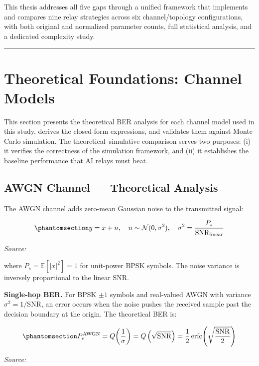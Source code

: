 This thesis addresses all five gaps through a unified framework that implements and compares nine relay strategies across six channel/topology configurations, with both original and normalized parameter counts, full statistical analysis, and a dedicated complexity study.

\begin{center}\rule{0.5\linewidth}{0.5pt}\end{center}

\section{Theoretical Foundations: Channel Models}\label{sec:theoretical-foundations-channel-models}

This section presents the theoretical BER analysis for each channel model used in this study, derives the closed-form expressions, and validates them against Monte Carlo simulation. The theoretical--simulative comparison serves two purposes: (i) it verifies the correctness of the simulation framework, and (ii) it establishes the baseline performance that AI relays must beat.

\subsection{AWGN Channel --- Theoretical Analysis}\label{sec:awgn-channel-theoretical-analysis}

The AWGN channel adds zero-mean Gaussian noise to the transmitted signal:

\begin{equation}\protect\phantomsection\label{eq:awgn-channel}{y = x + n, \quad n \sim \mathcal{N}(0, \sigma^2), \quad \sigma^2 = \frac{P_s}{\text{SNR}_{\text{linear}}}
}\end{equation} \par{\small\textit{Source: \cite{proakis2008digital}}}

where \(P_s = \mathbb{E}[|x|^2] = 1\) for unit-power BPSK symbols. The noise variance is inversely proportional to the linear SNR.

\textbf{Single-hop BER.} For BPSK \(\pm 1\) symbols and real-valued AWGN with variance \(\sigma^2 = 1/\text{SNR}\), an error occurs when the noise pushes the received sample past the decision boundary at the origin. The theoretical BER is:

\begin{equation}\protect\phantomsection\label{eq:awgn-ber}{P_e^{\text{AWGN}} = Q\!\left(\frac{1}{\sigma}\right) = Q\left(\sqrt{\text{SNR}}\right) = \frac{1}{2}\,\text{erfc}\!\left(\sqrt{\frac{\text{SNR}}{2}}\right)
}\end{equation} \par{\small\textit{Source: \cite{proakis2008digital}}}

